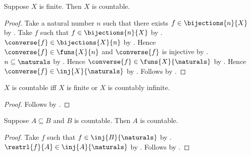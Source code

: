 \begin{theorem}\label{finite_is_countable}
    Suppose $X$ is finite.
    Then $X$ is countable.
\end{theorem}
\begin{proof}
    Take a natural number $n$ such that there exists
        $f\in\bijections{n}{X}$ by .
    Take $f$ such that $f\in\bijections{n}{X}$ by \auto.
    $\converse{f}\in\bijections{X}{n}$
        by .
    Hence $\converse{f}\in\funs{X}{n}$ and
        $\converse{f}$ is injective
        by .
    $n\subseteq\naturals$ by
        .
    Hence $\converse{f}\in\funs{X}{\naturals}$
        by .
    Hence $\converse{f}\in\inj{X}{\naturals}$
        by .
    Follows by .
\end{proof}

\begin{proposition}\label{countable_iff_finite_or_countably_infinite}
    $X$ is countable iff $X$ is finite or $X$ is countably infinite.
\end{proposition}
\begin{proof}
    Follows by
        .
\end{proof}

\begin{theorem}\label{subseteq_countable_is_countable}
    Suppose $A\subseteq B$ and $B$ is countable.
    Then $A$ is countable.
\end{theorem}
\begin{proof}
    Take $f$ such that $f\in\inj{B}{\naturals}$ by .
    $\restrl{f}{A}\in\inj{A}{\naturals}$ by .
    Follows by .
\end{proof}

